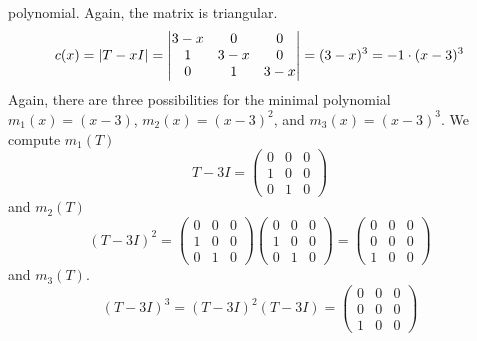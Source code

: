 \begin{exercises}
\begin{answer}
\begin{exparts}
        polynomial.
       \partsitem Again, the matrix is triangular.
        \begin{equation*}
          c(x)=\deter{T-xI}
              =
              \begin{vmatrix}
                3-x  &0   &0   \\
                1    &3-x &0   \\
                0    &1   &3-x
              \end{vmatrix}
              =(3-x)^3=-1\cdot (x-3)^3
        \end{equation*}
        Again, there are three possibilities for the minimal polynomial
        $m_1(x)=(x-3)$, $m_2(x)=(x-3)^2$, and $m_3(x)=(x-3)^3$.
        We compute $m_1(T)$
        \begin{equation*}
          T-3I=
          \begin{pmatrix}
            0  &0  &0  \\
            1  &0  &0  \\
            0  &1  &0
          \end{pmatrix}
        \end{equation*}
        and $m_2(T)$
        \begin{equation*}
          (T-3I)^2=
          \begin{pmatrix}
            0  &0  &0  \\
            1  &0  &0  \\
            0  &1  &0
          \end{pmatrix}
          \begin{pmatrix}
            0  &0  &0  \\
            1  &0  &0  \\
            0  &1  &0
          \end{pmatrix}
          =          
          \begin{pmatrix}
            0  &0  &0  \\
            0  &0  &0  \\
            1  &0  &0
          \end{pmatrix}
        \end{equation*}
        and $m_3(T)$.
        \begin{equation*}
          (T-3I)^3
          =(T-3I)^2(T-3I)
          =
          \begin{pmatrix}
            0  &0  &0  \\
            0  &0  &0  \\
            1  &0  &0

\end{pmatrix}
\end{equation*}
\end{exparts}
\end{answer}
\end{exercises}
